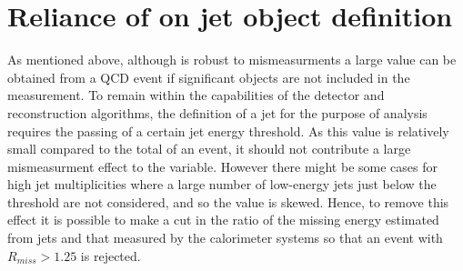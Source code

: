 \section{Reliance of \alt on jet object definition}

As mentioned above, although \alt is robust to mismeasurments a large value can be obtained from a QCD event if significant objects are not included in the measurement. To remain within the capabilities of the detector and reconstruction algorithms, the definition of a jet for the purpose of analysis requires the passing of a certain jet energy threshold. As this value is relatively small compared to the total \HT of an event, it should not contribute a large mismeasurment effect to the \alt variable. However there might be some cases for high jet multiplicities where a large number of low-energy jets just below the threshold are not considered, and so the \alt value is skewed. Hence, to remove this effect it is possible to make a cut in the ratio of the missing energy estimated from jets \mht and that measured by the calorimeter systems \met so that an event with $R_{miss} > 1.25$ is rejected. 
